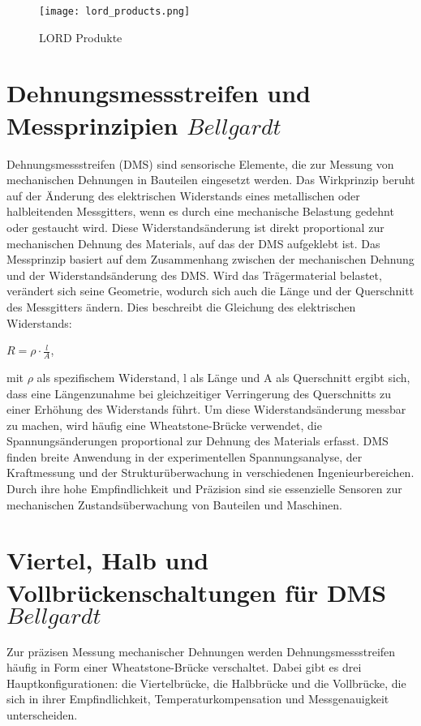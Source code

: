 \begin{figure}[h]
    \begin{center}
        \texttt{[image: lord\_products.png]}
        \caption[LORD Produkte (Abbildungsverzeichnis)]{LORD Produkte
        \cite{VLInkManual}
        }
        \label{fig:lordproducts}
    \end{center}
\end{figure}


\section{Dehnungsmessstreifen und Messprinzipien \(Bellgardt\)}
Dehnungsmessstreifen (DMS) sind sensorische Elemente, die zur Messung von mechanischen Dehnungen in Bauteilen eingesetzt werden. Das Wirkprinzip beruht auf der Änderung des elektrischen Widerstands eines metallischen oder halbleitenden Messgitters, wenn es durch eine mechanische Belastung gedehnt oder gestaucht wird. Diese Widerstandsänderung ist direkt proportional zur mechanischen Dehnung des Materials, auf das der DMS aufgeklebt ist. 
Das Messprinzip basiert auf dem Zusammenhang zwischen der mechanischen Dehnung und der Widerstandsänderung des DMS. Wird das Trägermaterial belastet, verändert sich seine Geometrie, wodurch sich auch die Länge und der Querschnitt des Messgitters ändern. Dies beschreibt die Gleichung des elektrischen Widerstands:

$R = \rho \cdot \frac{l}{A}$,

mit $\rho$ als spezifischem Widerstand, l als Länge und A als Querschnitt ergibt sich, dass eine Längenzunahme bei gleichzeitiger Verringerung des Querschnitts zu einer Erhöhung des Widerstands führt. Um diese Widerstandsänderung messbar zu machen, wird häufig eine Wheatstone-Brücke verwendet, die Spannungsänderungen proportional zur Dehnung des Materials erfasst.
DMS finden breite Anwendung in der experimentellen Spannungsanalyse, der Kraftmessung und der Strukturüberwachung in verschiedenen Ingenieurbereichen. Durch ihre hohe Empfindlichkeit und Präzision sind sie essenzielle Sensoren zur mechanischen Zustandsüberwachung von Bauteilen und Maschinen.










\newpage{}
\section{Viertel\-, Halb\- und Vollbr\"uckenschaltungen für DMS \(Bellgardt\)}
Zur präzisen Messung mechanischer Dehnungen werden Dehnungsmessstreifen häufig in Form einer Wheatstone-Brücke verschaltet. Dabei gibt es drei Hauptkonfigurationen: die Viertelbrücke, die Halbbrücke und die Vollbrücke, die sich in ihrer Empfindlichkeit, Temperaturkompensation und Messgenauigkeit unterscheiden.
